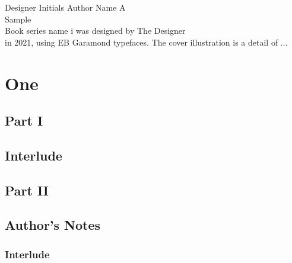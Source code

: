 \documentclass[11pt]{memoir}
\begin{document}
\frontmatter

\halftitlepage
\titlepage
{Designer Initials}
{Author Name}
{
    {\extrahuge\swshape A}\\
    \vspace{0.3em}
    {\extrahuge Sample}\\
    \vspace{0.3em}
    {\extrahuge Book}
}
{series name}
{i}
\colophonpage
{was designed by The Designer\\
in 2021, using EB Garamond typefaces.
}{The cover illustration is a detail of ...
\lipsum[1][1-3]
}

\tableofcontents*

\startmainmatter

\chapter{One}
\section{Part I}
\lipsum[1]

\lipsum[2][1]

\lipsum[2][2-5]

\section{Interlude}
\lipsum[3]

\section{Part II}
\lipsum[4]
\sectionrule
\lipsum[5]

\startappendix
\section{Author's Notes}
\subsection{Interlude}
\lipsum[6]
\end{document}
